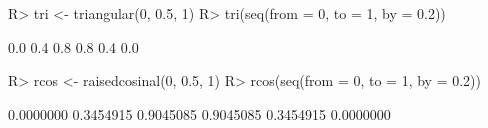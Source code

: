 \begin{Schunk}
% --begin: "triangular"
\begin{Sinput}
R> tri <- triangular(0, 0.5, 1)
R> tri(seq(from = 0, to = 1, by = 0.2))
\end{Sinput}
\begin{Soutput}
[1] 0.0 0.4 0.8 0.8 0.4 0.0
\end{Soutput}
\begin{Sinput}
R> rcos <- raisedcosinal(0, 0.5, 1)
R> rcos(seq(from = 0, to = 1, by = 0.2))
\end{Sinput}
\begin{Soutput}
[1] 0.0000000 0.3454915 0.9045085 0.9045085 0.3454915 0.0000000
\end{Soutput}
%
% --end: "triangular"
\end{Schunk}
